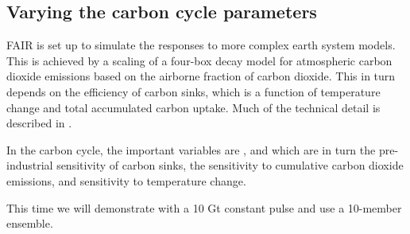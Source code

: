 \documentclass[letterpaper,10pt,english]{sphinxmanual}
\begin{document}
\noindent{}


\subsection{Varying the carbon cycle parameters}
\label{\detokenize{examples:varying-the-carbon-cycle-parameters}}
FAIR is set up to simulate the responses to more complex earth system
models. This is achieved by a scaling of a four-box decay model for
atmospheric carbon dioxide emissions based on the airborne fraction of
carbon dioxide. This in turn depends on the efficiency of carbon sinks,
which is a function of temperature change and total accumulated carbon
uptake. Much of the technical detail is described in .

In the carbon cycle, the important variables are ,  and
 which are in turn the pre-industrial sensitivity of carbon sinks,
the sensitivity to cumulative carbon dioxide emissions, and sensitivity
to temperature change.

This time we will demonstrate with a 10 Gt constant pulse and use a
10-member ensemble.
\end{document}
